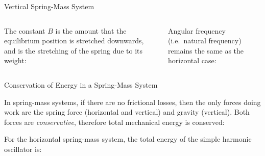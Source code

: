 \documentclass[12pt,compress,aspectratio=169]{beamer}
\newcommand{\mb}[1]{\ensuremath\mathbf{#1}}
\newcommand{\eq}[2]{\vspace{#1}{\Large\begin{displaymath}#2\end{displaymath}}}
\begin{document}
\begin{frame}{Vertical Spring-Mass System}
  \vspace{.2in}
  \begin{columns}

    The constant $B$ is the amount that the equilibrium position is stretched
    downwards, and is the stretching of the spring due to its weight:
    
    \eq{-.2in}{
      B=\frac{mg}{k}
    }

    Angular frequency (i.e.\ natural frequency) remains the same as the
    horizontal case:

    \eq{-.2in}{
      \omega=\sqrt{\frac{k}{m}}
    }
  \end{columns}
\end{frame}



\begin{frame}{Conservation of Energy in a Spring-Mass System}

  In spring-mass systems, if there are no frictional losses, then the only
  forces doing work are the spring force (horizontal and vertical) and gravity
  (vertical). Both forces are \emph{conservative}, therefore total mechanical
  energy is conserved:

  \eq{-.2in}{
    K + U_e + U_g = K' + U_e' + U_g'
  }
  
  For the horizontal spring-mass system, the total energy of the simple harmonic
  oscillator is:
    
  \eq{-.2in}{
    \boxed{E_T=\frac{1}{2}kA^2}
  }
\end{frame}
\end{document}
